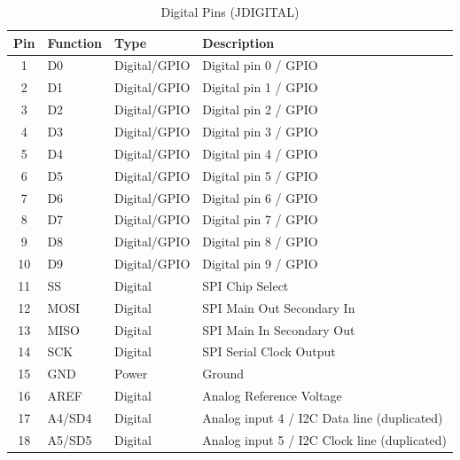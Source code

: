 \begin{table}[h]
	\centering
	\caption{Digital Pins (JDIGITAL)}
	\label{table:JDIGITAL}
	\begin{tabular}{|c|l|l|l|}
		\hline
		\textbf{Pin} & \textbf{Function} & \textbf{Type} & \textbf{Description} \\ \hline
		1 & D0 & Digital/GPIO & Digital pin 0 / GPIO \\ \hline
		2 & D1 & Digital/GPIO & Digital pin 1 / GPIO \\ \hline
		3 & D2 & Digital/GPIO & Digital pin 2 / GPIO \\ \hline
		4 & D3 & Digital/GPIO & Digital pin 3 / GPIO \\ \hline
		5 & D4 & Digital/GPIO & Digital pin 4 / GPIO \\ \hline
		6 & D5 & Digital/GPIO & Digital pin 5 / GPIO \\ \hline
		7 & D6 & Digital/GPIO & Digital pin 6 / GPIO \\ \hline
		8 & D7 & Digital/GPIO & Digital pin 7 / GPIO \\ \hline
		9 & D8 & Digital/GPIO & Digital pin 8 / GPIO \\ \hline
		10 & D9 & Digital/GPIO & Digital pin 9 / GPIO \\ \hline
		11 & SS & Digital & SPI Chip Select \\ \hline
		12 & MOSI & Digital & SPI Main Out Secondary In \\ \hline
		13 & MISO & Digital & SPI Main In Secondary Out \\ \hline
		14 & SCK & Digital & SPI Serial Clock Output \\ \hline
		15 & GND & Power & Ground \\ \hline
		16 & AREF & Digital & Analog Reference Voltage \\ \hline
		17 & A4/SD4 & Digital & Analog input 4 / I2C Data line (duplicated) \\ \hline
		18 & A5/SD5 & Digital & Analog input 5 / I2C Clock line (duplicated) \\ \hline
	\end{tabular}
\end{table}

